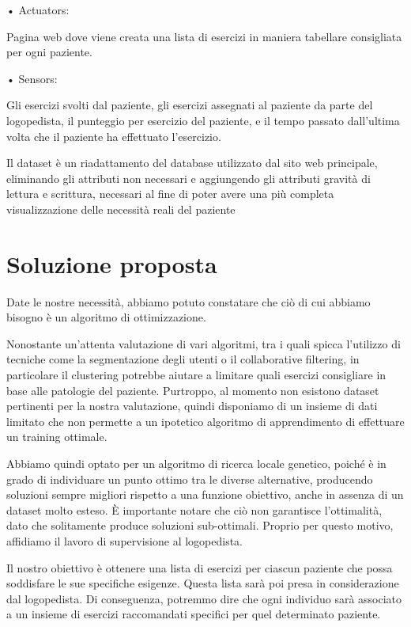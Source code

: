 \documentclass{article}
\begin{document}
    • Actuators:

    Pagina web dove viene creata una lista di esercizi in maniera tabellare consigliata per ogni paziente.

    • Sensors:

    Gli esercizi svolti dal paziente, gli esercizi assegnati al paziente da parte del logopedista, il punteggio per esercizio del paziente, e il tempo passato
    dall'ultima volta che il paziente ha effettuato l'esercizio.

    Il dataset è un riadattamento del database utilizzato dal sito web principale, eliminando gli attributi non necessari e aggiungendo gli attributi gravità
    di lettura e scrittura, necessari al fine di poter avere una più completa visualizzazione delle necessità reali del paziente
    \pagebreak
    \section{Soluzione proposta}

    Date le nostre necessità, abbiamo potuto constatare che ciò di cui abbiamo bisogno è un algoritmo di ottimizzazione.

    Nonostante un'attenta valutazione di vari algoritmi, tra i quali spicca l'utilizzo di tecniche come la segmentazione degli utenti o il collaborative filtering,
    in particolare il clustering potrebbe aiutare a limitare quali esercizi consigliare in base alle patologie del paziente. Purtroppo, al momento non esistono
    dataset pertinenti per la nostra valutazione, quindi disponiamo di un insieme di dati limitato che non permette a un ipotetico algoritmo di apprendimento di
    effettuare un training ottimale.

    Abbiamo quindi optato per un algoritmo di ricerca locale genetico, poiché è in grado di individuare un punto ottimo tra le diverse alternative, producendo
    soluzioni sempre migliori rispetto a una funzione obiettivo, anche in assenza di un dataset molto esteso. È importante notare che ciò non garantisce l'ottimalità,
    dato che solitamente produce soluzioni sub-ottimali. Proprio per questo motivo, affidiamo il lavoro di supervisione al logopedista.

    Il nostro obiettivo è ottenere una lista di esercizi per ciascun paziente che possa soddisfare le sue specifiche esigenze. Questa lista sarà poi presa in
    considerazione dal logopedista. Di conseguenza, potremmo dire che ogni individuo sarà associato a un insieme di esercizi raccomandati specifici per quel determinato
    paziente.
\end{document}
